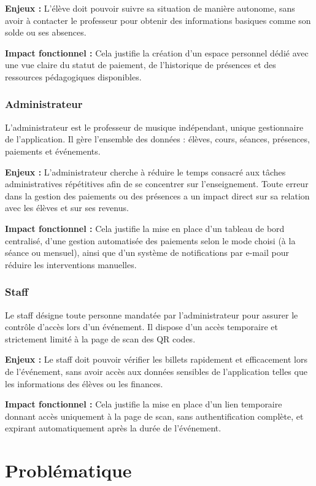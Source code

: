 \documentclass{article}
\begin{document}
\textbf{Enjeux :} L'élève doit pouvoir suivre sa situation 
de manière autonome, sans avoir à contacter le professeur 
pour obtenir des informations basiques comme son solde ou 
ses absences.

\textbf{Impact fonctionnel :} Cela justifie la création d'un 
espace personnel dédié avec une vue claire du statut de 
paiement, de l'historique de présences et des ressources 
pédagogiques disponibles.

\subsubsection{Administrateur}
L'administrateur est le professeur de musique indépendant, 
unique gestionnaire de l'application. Il gère l'ensemble 
des données : élèves, cours, séances, présences, paiements 
et événements.

\textbf{Enjeux :} L'administrateur cherche à réduire le temps 
consacré aux tâches administratives répétitives afin de se 
concentrer sur l'enseignement. Toute erreur dans la gestion 
des paiements ou des présences a un impact direct sur sa 
relation avec les élèves et sur ses revenus.

\textbf{Impact fonctionnel :} Cela justifie la mise en place 
d'un tableau de bord centralisé, d'une gestion automatisée 
des paiements selon le mode choisi (à la séance ou mensuel), 
ainsi que d'un système de notifications par e-mail pour 
réduire les interventions manuelles.

\subsubsection{Staff}
Le staff désigne toute personne mandatée par l'administrateur 
pour assurer le contrôle d'accès lors d'un événement. Il 
dispose d'un accès temporaire et strictement limité à la 
page de scan des QR codes.

\textbf{Enjeux :} Le staff doit pouvoir vérifier les billets 
rapidement et efficacement lors de l'événement, sans avoir 
accès aux données sensibles de l'application telles que les 
informations des élèves ou les finances.

\textbf{Impact fonctionnel :} Cela justifie la mise en place 
d'un lien temporaire donnant accès uniquement à la page de 
scan, sans authentification complète, et expirant 
automatiquement après la durée de l'événement.

\section{Problématique}
\end{document}

